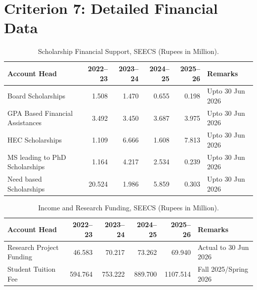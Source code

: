
\chapter{Criterion 7: Detailed Financial Data}\label{app:criterion7_financial_tables}

\begin{table}[H]
\centering
\caption{Scholarship Financial Support, SEECS (Rupees in Million).}
\label{tab:scholarships}
\begingroup\footnotesize
\setlength{\tabcolsep}{5pt}
\renewcommand{\arraystretch}{1.12}
\begin{tabular}{@{}lrrrrl@{}}
\toprule
\textbf{Account Head} & \textbf{2022--23} & \textbf{2023--24} & \textbf{2024--25} & \textbf{2025--26} & \textbf{Remarks} \\
\midrule
Board Scholarships & 1.508 & 1.470 & 0.655 & 0.198 & Upto 30 Jun 2026 \\
GPA Based Financial Assistances & 3.492 & 3.450 & 3.687 & 3.975 & Upto 30 Jun 2026 \\
HEC Scholarships & 1.109 & 6.666 & 1.608 & 7.813 & Upto 30 Jun 2026 \\
MS leading to PhD Scholarships & 1.164 & 4.217 & 2.534 & 0.239 & Upto 30 Jun 2026 \\
Need based Scholarships & 20.524 & 1.986 & 5.859 & 0.303 & Upto 30 Jun 2026 \\
\bottomrule
\end{tabular}
\endgroup
\end{table}

\begin{table}[H]
\centering
\caption{Income and Research Funding, SEECS (Rupees in Million).}
\label{tab:income}
\begingroup\footnotesize
\setlength{\tabcolsep}{5pt}
\renewcommand{\arraystretch}{1.12}
\begin{tabular}{@{}lrrrrl@{}}
\toprule
\textbf{Account Head} & \textbf{2022--23} & \textbf{2023--24} & \textbf{2024--25} & \textbf{2025--26} & \textbf{Remarks} \\
\midrule
Research Project Funding & 46.583 & 70.217 & 73.262 & 69.940 & Actual to 30 Jun 2026 \\
Student Tuition Fee & 594.764 & 753.222 & 889.700 & 1107.514 & Fall 2025/Spring 2026 \\
\bottomrule
\end{tabular}
\endgroup
\end{table}

